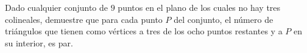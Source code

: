 Dado cualquier conjunto de $9$ puntos en el plano de los cuales no hay tres colineales, demuestre que para cada punto $P$ del conjunto, el número de triángulos que tienen como vértices a tres de los ocho puntos restantes y a $P$ en su interior, es par.
